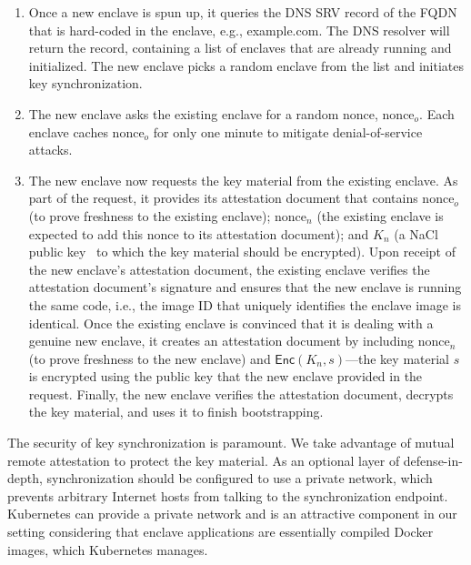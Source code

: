 \begin{enumerate}

  \item Once a new enclave is spun up, it queries the DNS SRV record of the FQDN
    that is hard-coded in the enclave, e.g., example.com.  The DNS resolver will
    return the record, containing a list of enclaves that are already running
    and initialized.  The new enclave picks a random enclave from the list and
    initiates key synchronization.

  \item The new enclave asks the existing enclave for a random nonce,
    $\textrm{nonce}_o$.  Each enclave caches $\textrm{nonce}_o$ for only one
    minute to mitigate denial-of-service attacks.

  \item The new enclave now requests the key material from the existing enclave.
    As part of the request, it provides its attestation document that contains
    $\textrm{nonce}_o$ (to prove freshness to the existing enclave);
    $\textrm{nonce}_n$ (the existing enclave is expected to add this nonce to
    its attestation document); and $K_n$ (a NaCl public key~\cite{nacl} to which
    the key material should be encrypted).  Upon receipt of the new enclave's
    attestation document, the existing enclave verifies the attestation
    document's signature and ensures that the new enclave is running the same
    code, i.e., the image ID that uniquely identifies the enclave
    image is identical.  Once the existing enclave is convinced that it is
    dealing with a genuine new enclave, it creates an attestation document by
    including $\textrm{nonce}_n$ (to prove freshness to the new enclave) and
    $\textsf{Enc}(K_n, s)$---the key material $s$ is encrypted using the public
    key that the new enclave provided in the request.  Finally, the new enclave
    verifies the attestation document, decrypts the key material, and uses it to
    finish bootstrapping.

\end{enumerate}

The security of key synchronization is paramount.  We take advantage of mutual
remote attestation to protect the key material.  As an optional layer of
defense-in-depth, synchronization should be configured to use a private network,
which prevents arbitrary Internet hosts from talking to the synchronization
endpoint.  Kubernetes can provide a private network and is an attractive
component in our setting considering that enclave applications are essentially
compiled Docker images, which Kubernetes manages.

